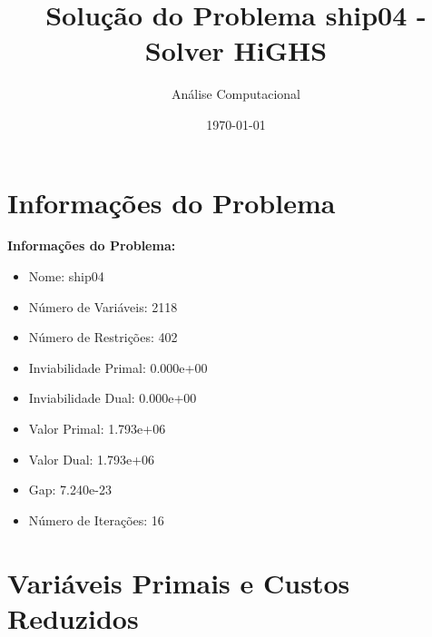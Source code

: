 \documentclass[12pt]{article}
\title{Solução do Problema ship04 - Solver HiGHS}
\author{Análise Computacional}
\date{\today}
\begin{document}
\maketitle

\section{Informações do Problema}

\textbf{Informações do Problema:}
\begin{itemize}
\item Nome: ship04
\item Número de Variáveis: 2118
\item Número de Restrições: 402
\item Inviabilidade Primal: 0.000e+00
\item Inviabilidade Dual: 0.000e+00
\item Valor Primal: 1.793e+06
\item Valor Dual: 1.793e+06
\item Gap: 7.240e-23
\item Número de Iterações: 16
\end{itemize}


\section{Variáveis Primais e Custos Reduzidos}
\end{document}
